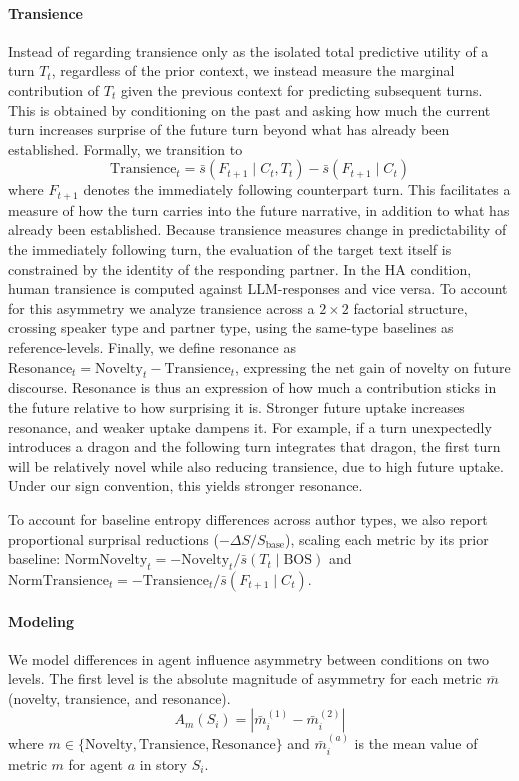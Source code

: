 \documentclass[11pt]{article}
\begin{document}
\paragraph{Transience}
Instead of regarding transience only as the isolated total predictive utility of a turn $T_t$, regardless of the prior context, we instead measure the marginal contribution of $T_t$ given the previous context for predicting subsequent turns. This is obtained by conditioning on the past and asking how much the current turn increases surprise of the future turn beyond what has already been established. Formally, we transition to
\begin{equation}
\mathrm{Transience}_t
=
\bar{s}(F_{t+1} \mid C_t, T_t)
-
\bar{s}(F_{t+1} \mid C_t)
\end{equation}
where $F_{t+1}$ denotes the immediately following counterpart turn. This facilitates a measure of how the turn carries into the future narrative, in addition to what has already been established. Because transience measures change in predictability of the immediately following turn, the evaluation of the target text itself is constrained by the identity of the responding partner. In the HA condition, human transience is computed against LLM-responses and vice versa. To account for this asymmetry we analyze transience across a $2 \times 2$ factorial structure, crossing speaker type and partner type, using the same-type baselines as reference-levels.
Finally, we define resonance as $\mathrm{Resonance}_t = \mathrm{Novelty}_t - \mathrm{Transience}_t$, expressing the net gain of novelty on future discourse. Resonance is thus an expression of how much a contribution sticks in the future relative to how surprising it is. Stronger future uptake increases resonance, and weaker uptake dampens it.
For example, if a turn unexpectedly introduces a dragon and the following turn integrates that dragon, the first turn will be relatively novel while also reducing transience, due to high future uptake. Under our sign convention, this yields stronger resonance.

To account for baseline entropy differences across author types, we also report proportional surprisal reductions ($-\Delta S / S_{\text{base}}$), scaling each metric by its prior baseline: $\text{NormNovelty}_t = -\text{Novelty}_t / \bar{s}(T_t \mid \text{BOS})$ and $\text{NormTransience}_t = -\text{Transience}_t / \bar{s}(F_{t+1} \mid C_t)$.

\paragraph{Modeling}
We model differences in agent influence asymmetry between conditions on two levels. The first level is the absolute magnitude of asymmetry for each metric $\overline{m}$ (novelty, transience, and resonance).
\begin{equation}
    A_m(S_i)
    =
    \left|
    \bar{m}^{(1)}_i
    -
    \bar{m}^{(2)}_i
    \right|
\end{equation}
where $m \in \{\mathrm{Novelty}, \mathrm{Transience}, \mathrm{Resonance}\}$ and $\bar{m}^{(a)}_i$ is the mean value of metric $m$ for agent $a$ in story $S_i$.
\end{document}
